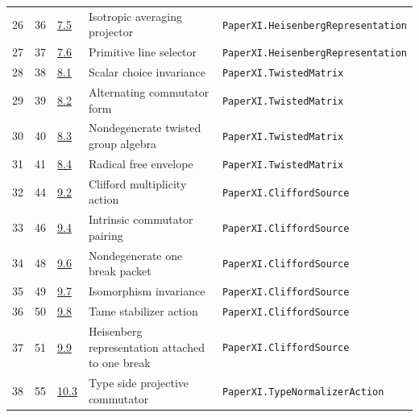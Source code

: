 \documentclass[10pt,oneside]{book}
\begin{document}
\begin{longtable}{@{}p{}p{}p{}>{\raggedright\arraybackslash}p{}p{}@{}}
26&36&\href{https://komorebi.invalid/b06/obligation_26}{7.5}&Isotropic averaging projector&\nolinkurl{PaperXI.HeisenbergRepresentation}\\

27&37&\href{https://komorebi.invalid/b06/obligation_27}{7.6}&Primitive line selector&\nolinkurl{PaperXI.HeisenbergRepresentation}\\

28&38&\href{https://komorebi.invalid/b06/obligation_28}{8.1}&Scalar choice invariance&\nolinkurl{PaperXI.TwistedMatrix}\\

29&39&\href{https://komorebi.invalid/b06/obligation_29}{8.2}&Alternating commutator form&\nolinkurl{PaperXI.TwistedMatrix}\\

30&40&\href{https://komorebi.invalid/b06/obligation_30}{8.3}&Nondegenerate twisted group algebra&\nolinkurl{PaperXI.TwistedMatrix}\\

31&41&\href{https://komorebi.invalid/b06/obligation_31}{8.4}&Radical free envelope&\nolinkurl{PaperXI.TwistedMatrix}\\

32&44&\href{https://komorebi.invalid/b06/obligation_32}{9.2}&Clifford multiplicity action&\nolinkurl{PaperXI.CliffordSource}\\

33&46&\href{https://komorebi.invalid/b06/obligation_33}{9.4}&Intrinsic commutator pairing&\nolinkurl{PaperXI.CliffordSource}\\

34&48&\href{https://komorebi.invalid/b06/obligation_34}{9.6}&Nondegenerate one break packet&\nolinkurl{PaperXI.CliffordSource}\\

35&49&\href{https://komorebi.invalid/b06/obligation_35}{9.7}&Isomorphism invariance&\nolinkurl{PaperXI.CliffordSource}\\

36&50&\href{https://komorebi.invalid/b06/obligation_36}{9.8}&Tame stabilizer action&\nolinkurl{PaperXI.CliffordSource}\\

37&51&\href{https://komorebi.invalid/b06/obligation_37}{9.9}&Heisenberg representation attached to one break&\nolinkurl{PaperXI.CliffordSource}\\

38&55&\href{https://komorebi.invalid/b06/obligation_38}{10.3}&Type side projective commutator&\nolinkurl{PaperXI.TypeNormalizerAction}\\


\end{longtable}
\end{document}
